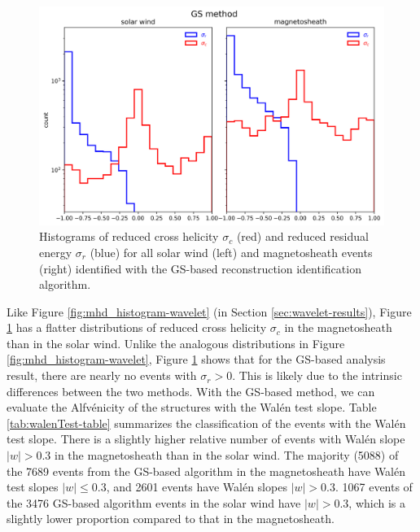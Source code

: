 \begin{figure}
    \centering
    \includegraphics[width=\textwidth]{Figures/Histograms/sigr_sigc_GS.png}
    \caption[Reduced cross helicity and reduced residual energy for all events identified via GS-based reconstruction algorithm]{Histograms of reduced cross helicity $\sigma_c$ (red) and reduced residual energy $\sigma_r$ (blue) for all solar wind (left) and magnetosheath events (right) identified with the GS-based reconstruction identification algorithm.}
    \label{fig:mhd_histogram-GS}
\end{figure}

Like Figure \ref{fig:mhd_histogram-wavelet} (in Section \ref{sec:wavelet-results}), Figure \ref{fig:mhd_histogram-GS} has a flatter distributions of reduced cross helicity $\sigma_c$ in the magnetosheath than in the solar wind. Unlike the analogous distributions in Figure \ref{fig:mhd_histogram-wavelet}, Figure \ref{fig:mhd_histogram-GS} shows that for the GS-based analysis result, there are nearly no events with $\sigma_r>0$. This is likely due to the intrinsic differences between the two methods. With the GS-based method, we can evaluate the Alfv\'enicity of the structures with the Wal\'en test slope. Table \ref{tab:walenTest-table} summarizes the classification of the events with the Wal\'en test slope. There is a slightly higher relative number of events with Wal\'en slope $|w|>0.3$ in the magnetosheath than in the solar wind. The majority (5088) of the 7689 events from the GS-based algorithm in the magnetosheath have Wal\'en test slopes $|w|\leq 0.3$, and 2601 events have Wal\'en slopes $|w|>0.3$. 1067 events of the 3476 GS-based algorithm events in the solar wind have $|w|>0.3$, which is a slightly lower proportion compared to that in the magnetosheath.

